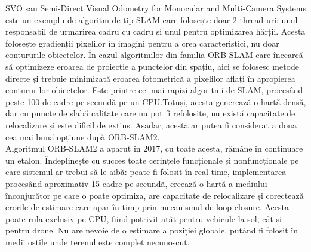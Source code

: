 \documentclass[12pt,a4paper]{report}
\begin{document}
SVO sau Semi-Direct Visual Odometry for Monocular and Multi-Camera Systems este un exemplu 
de algoritm de tip SLAM care folosește doar 2 thread-uri: unul responsabil de 
urmărirea cadru cu cadru și unul pentru optimizarea hărții. Acesta folosește gradienții
pixelilor în imagini pentru a crea caracteristici, nu doar contururile obiectelor. În cazul
algoritmilor din familia ORB-SLAM care încearcă să optimizeze eroarea de proiecție a punctelor
din spațiu, aici se folosesc metode directe și trebuie minimizată eroarea fotometrică a 
pixelilor aflați în apropierea contururilor obiectelor. Este printre cei mai rapizi algoritmi
de SLAM, procesând peste 100 de cadre pe secundă pe un CPU.\@ Totuși, acesta generează o hartă densă, dar cu 
puncte de slabă calitate care nu pot fi refolosite, nu există capacitate de relocalizare și 
este dificil de extins. Așadar, acesta ar putea fi considerat a doua cea mai bună opțiune după ORB-SLAM2.\\

Algoritmul ORB-SLAM2 a aparut în 2017, cu toate acesta, rămâne în continuare 
un etalon. Îndeplinește cu succes toate cerințele funcționale 
și nonfuncționale pe care sistemul ar trebui să le aibă: poate fi folosit în real time,
implementarea procesând aproximativ 15 cadre pe secundă, creează o hartă a mediului înconjurător
pe care o poate optimiza, are capacitate de relocalizare și corectează erorile de estimare
care apar în timp prin mecanismul de loop closure. Acesta poate rula exclusiv pe CPU, fiind
potrivit atât pentru vehicule la sol, cât și pentru drone. Nu are nevoie de o estimare a poziției
globale, putând fi folosit în medii ostile unde terenul este complet necunoscut.  

\end{document}
